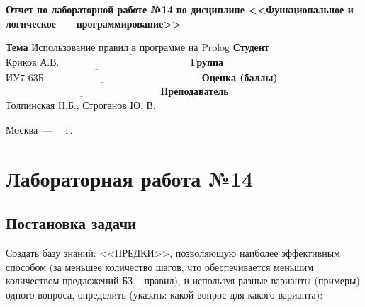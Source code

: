 \documentclass[12pt]{report}
\begin{document}
\begin{titlepage}
		\begin{center}
			\noindent\begin{minipage}{1.1\textwidth}\centering
				\Large\textbf{  Отчет по лабораторной работе №14}\newline
				\textbf{по дисциплине <<Функциональное и логическое}\newline
				\textbf{~~~программирование>>}\newline\newline
			\end{minipage}
		\end{center}
		
		\noindent\textbf{Тема} $\underline{\text{Использование правил в программе на Prolog}}$\newline\newline
		\noindent\textbf{Студент} $\underline{\text{Криков А.В.~~~~~~~~~~~~~~~~~~~~~~~~~~~~~~~~~~~~~~~}}$\newline\newline
		\noindent\textbf{Группа} $\underline{\text{ИУ7-63Б~~~~~~~~~~~~~~~~~~~~~~~~~~~~~~~~~~~~~~~~~~~~~~~}}$\newline\newline
		\noindent\textbf{Оценка (баллы)} $\underline{\text{~~~~~~~~~~~~~~~~~~~~~~~~~~~~~~~~~~~~~~~~~~~~~~}}$\newline\newline
		\noindent\textbf{Преподаватель} $\underline{\text{Толпинская Н.Б., Строганов Ю. В.}}$\newline\newline\newline
		
		\begin{center}
			\vfill
			Москва~---~\the\year
			~г.
		\end{center}
	\end{titlepage}
	

\chapter*{Лабораторная работа №14}
\section*{Постановка задачи}

Создать базу знаний: <<ПРЕДКИ>>, позволяющую наиболее эффективным способом (за меньшее количество шагов, что обеспечивается меньшим количеством предложений БЗ – правил), и используя разные варианты (примеры) одного вопроса, определить (указать: какой вопрос для какого варианта):
\end{document}
